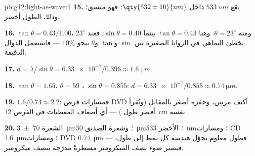 \begin{solution}{pb:g12:light-as-wave:1}
\textbf{15.} يقع $\qty{533}{nm}$ داخل $\qty{532 \pm 10}{nm}$:
فهو متسق؛ وذلك الطول أخضر.

\textbf{16.} $\tan\theta = 0.43/1.00$، ومنه $\theta = 23^\circ$. وهنا
$\tan\theta = 0.43$ بينما $\sin\theta = 0.40$: فعند $23^\circ$ يخطئ
التماهي في الزوايا الصغيرة بين $\sin$ و$\tan$ و$\theta$ بنحو
$10\%$ --- فاستعمل الدوال الدقيقة.

\textbf{17.} $d = \lambda/\sin\theta = \num{6.33e-7}/0.396 \approx
\qty{1.6}{\micro m}$.

\textbf{18.} $\tan\theta = 1.65$، $\theta = 59^\circ$،
$\sin\theta = 0.855$: $d = \num{6.33e-7}/0.855 \approx
\qty{0.74}{\micro m}$.

\textbf{19.} $1.6/0.74 \approx 2.2$: فمسارات قرص DVD أكثف مرتين،
وحفره أصغر بالمقابل (وتُقرأ  أقصر طول ) ---
أي أضعاف المعطيات في القرص \qty{12}{cm} نفسه.

\textbf{20.} الشعرة \qty{70 \pm 3}{\micro m}؛ وشعرة الصديق
\qty{50}{\micro m}؛  الأخضر \qty{533}{nm}؛ ومسارات CD
\qty{1.6}{\micro m}؛ ومسارات DVD \qty{0.74}{\micro m} --- فطول 
معلوم يحوّل هندسة كل نمط إلى طول، فيصير ضوء نصف
الميكرومتر مسطرةً مدرّجة بنصف ميكرومتر.
\end{solution}

